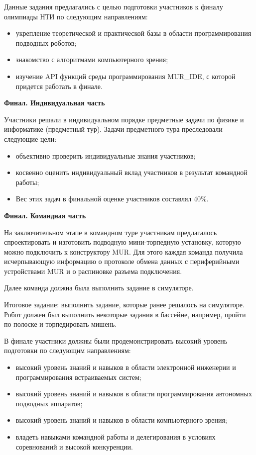 Данные задания предлагались с целью подготовки участников к финалу олимпиады НТИ по следующим направлениям:
\begin{itemize}
    \item укрепление теоретической и практической базы в области программирования подводных роботов;
    \item знакомство с алгоритмами компьютерного зрения;
    \item изучение API функций среды программирования MUR\_IDE, с которой придется работать в финале.
\end{itemize}

\textbf{Финал. Индивидуальная часть}

Участники решали в индивидуальном порядке предметные задачи по физике и информатике (предметный тур). Задачи предметного тура преследовали следующие цели:
\begin{itemize}
    \item объективно проверить индивидуальные знания участников;
    \item косвенно оценить индивидуальный вклад участников в результат командной работы;
    \item Вес этих задач в финальной оценке участников составлял 40\%.
\end{itemize}

\textbf{Финал. Командная часть}

На заключительном этапе в командном туре участникам предлагалось спроектировать и изготовить подводную мини-торпедную установку, которую можно подключить к конструктору MUR. Для этого каждая команда получила исчерпывающую информацию о протоколе обмена данных с периферийными устройствами MUR и о распиновке разъема подключения. 

Далее команда должна была выполнить задание в симуляторе.

Итоговое задание: выполнить задание, которые ранее решалось на симуляторе. Робот должен был выполнить некоторые задания в бассейне, например, пройти по полоске и торпедировать мишень.

В финале участники должны были продемонстрировать высокий уровень подготовки по следующим направлениям:
\begin{itemize}
    \item высокий уровень знаний и навыков в области электронной инженерии и программирования встраиваемых систем;
    \item высокий уровень знаний и навыков в области программирования автономных подводных аппаратов;
    \item высокий уровень знаний и навыков в области компьютерного зрения;
    \item владеть навыками командной работы и делегирования в условиях соревнований и высокой конкуренции.
\end{itemize}

\clearpage
\endgroup